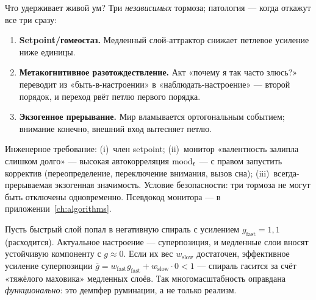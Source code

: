 Что удерживает живой ум? Три \emph{независимых} тормоза; патология — когда откажут
все три сразу:

\begin{enumerate}
\item \textbf{Setpoint/гомеостаз.} Медленный слой-аттрактор снижает петлевое
усиление ниже единицы.
\item \textbf{Метакогнитивное разотождествление.} Акт «почему я так часто злюсь?»
переводит из «быть-в-настроении» в «наблюдать-настроение» — второй порядок, и
переход рвёт петлю первого порядка.
\item \textbf{Экзогенное прерывание.} Мир вламывается ортогональным событием;
внимание конечно, внешний вход вытесняет петлю.
\end{enumerate}

Инженерное требование: (i)~член setpoint; (ii)~монитор «валентность залипла слишком
долго» — высокая автокорреляция $\mathrm{mood}_t$ — с правом запустить корректив
(переопределение, переключение внимания, вызов сна); (iii)~всегда-прерываемая
экзогенная значимость. Условие безопасности: три тормоза не могут быть отключены
одновременно. Псевдокод монитора — в приложении~\ref{ch:algorithms}.

\begin{workedbox}
Пусть быстрый слой попал в негативную спираль с усилением $g_{\text{fast}}=1{,}1$
(расходится). Актуальное настроение — суперпозиция, и медленные слои вносят
устойчивую компоненту с $g\approx 0$. Если их вес $w_{\text{slow}}$ достаточен,
эффективное усиление суперпозиции $\bar g=w_{\text{fast}}g_{\text{fast}}+w_{\text{slow}}\cdot 0<1$
— спираль гасится за счёт «тяжёлого маховика» медленных слоёв. Так многомасштабность
оправдана \emph{функционально}: это демпфер руминации, а не только реализм.
\end{workedbox}
